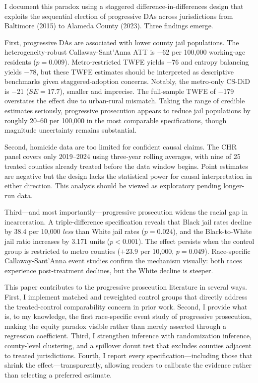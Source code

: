 \documentclass[12pt]{article}
\begin{document}
I document this paradox using a staggered difference-in-differences design that exploits the sequential election of progressive DAs across jurisdictions from Baltimore (2015) to Alameda County (2023). Three findings emerge.

First, progressive DAs are associated with lower county jail populations. The heterogeneity-robust Callaway-Sant'Anna ATT is $-$62 per 100,000 working-age residents ($p = 0.009$). Metro-restricted TWFE yields $-$76 and entropy balancing yields $-$78, but these TWFE estimates should be interpreted as descriptive benchmarks given staggered-adoption concerns. Notably, the metro-only CS-DiD is $-$21 ($SE = 17.7$), smaller and imprecise. The full-sample TWFE of $-$179 overstates the effect due to urban-rural mismatch. Taking the range of credible estimates seriously, progressive prosecution appears to reduce jail populations by roughly 20--60 per 100,000 in the most comparable specifications, though magnitude uncertainty remains substantial.

Second, homicide data are too limited for confident causal claims. The CHR panel covers only 2019--2024 using three-year rolling averages, with nine of 25 treated counties already treated before the data window begins. Point estimates are negative but the design lacks the statistical power for causal interpretation in either direction. This analysis should be viewed as exploratory pending longer-run data.

Third---and most importantly---progressive prosecution widens the racial gap in incarceration. A triple-difference specification reveals that Black jail rates decline by 38.4 per 10,000 \textit{less} than White jail rates ($p = 0.024$), and the Black-to-White jail ratio increases by 3.171 units ($p < 0.001$). The effect persists when the control group is restricted to metro counties ($+$23.9 per 10,000, $p = 0.049$). Race-specific Callaway-Sant'Anna event studies confirm the mechanism visually: both races experience post-treatment declines, but the White decline is steeper.

This paper contributes to the progressive prosecution literature \citep{agan2023misdemeanor, agan2025progressive, petersen2024progressive} in several ways. First, I implement matched and reweighted control groups that directly address the treated-control comparability concern in prior work. Second, I provide what is, to my knowledge, the first race-specific event study of progressive prosecution, making the equity paradox visible rather than merely asserted through a regression coefficient. Third, I strengthen inference with randomization inference, county-level clustering, and a spillover donut test that excludes counties adjacent to treated jurisdictions. Fourth, I report every specification---including those that shrink the effect---transparently, allowing readers to calibrate the evidence rather than selecting a preferred estimate.
\end{document}
